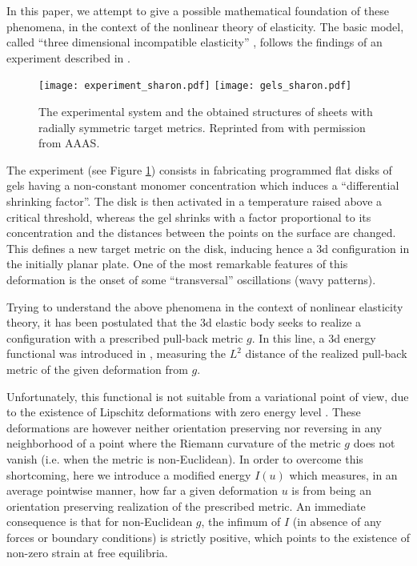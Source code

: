 \documentclass[leqno,twoside, 11pt]{amsart}
\theoremstyle{plain}
\theoremstyle{definition}
\numberwithin{equation}{section}
\numberwithin{figure}{section}
\begin{document}
In this paper, we attempt to give a possible mathematical foundation of these
phenomena, in the context of the nonlinear theory of elasticity.
The basic model, called ``three dimensional incompatible elasticity'' 
\cite{kupferman}, follows the findings of an experiment described 
in \cite{klein}.
\begin{figure}
\centering
\texttt{[image: experiment\_sharon.pdf]}
\hspace{0.8cm}
\texttt{[image: gels\_sharon.pdf]}
\caption{The experimental system and the obtained structures of sheets 
with radially symmetric target metrics.
Reprinted from \cite{klein} with permission from AAAS.}
\label{figura1}
\end{figure}
The experiment (see Figure \ref{figura1}) 
consists in fabricating programmed flat disks of gels having
a non-constant monomer concentration which induces a 
``differential shrinking factor''.  
The disk is then activated in a temperature raised above
a critical threshold, whereas the gel shrinks with a factor proportional 
to its concentration and the distances between the points on the surface 
are changed. This defines a new target metric on the disk, inducing hence 
a $3$d configuration in the initially 
planar plate. One of the most remarkable features of this deformation 
is the onset of some ``transversal'' oscillations (wavy patterns). 

Trying to understand the above phenomena in the context of nonlinear 
elasticity theory, it has been postulated \cite{klein, kupferman} that
the $3$d elastic body seeks to realize a configuration with 
a prescribed pull-back metric $g$.
In this line, a $3$d energy functional was introduced in \cite{kupferman},
measuring the $L^2$ distance of the realized pull-back metric of
the given deformation from $g$. 

Unfortunately, this functional is not suitable from a variational point
of view, due to the existence of Lipschitz deformations with zero energy level
\cite{gromov}. These deformations are however neither
orientation preserving nor reversing in any neighborhood of a point
where the Riemann curvature of the metric $g$ does not vanish
(i.e. when the metric is non-Euclidean). 
In order to overcome this shortcoming,
here we introduce a modified energy $I(u)$ which measures,
in an average pointwise manner, how far a given deformation $u$ is from being
an orientation preserving realization
of the prescribed metric. An immediate consequence is that for
non-Euclidean $g$, the infimum of $I$ (in absence of any forces or boundary
conditions) is strictly positive, which points to the existence of
non-zero strain at free equilibria.
\end{document}
